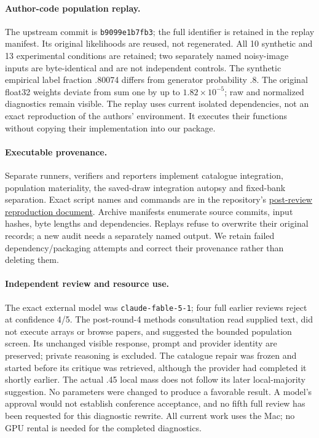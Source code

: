 \paragraph{Author-code population replay.}
The upstream commit is \texttt{b9099e1b7fb3}; the full identifier is retained
in the replay manifest.
Its original likelihoods are reused, not regenerated. All 10 synthetic and
13 experimental conditions are retained; two separately named noisy-image
inputs are byte-identical and are not independent controls. The synthetic
empirical label fraction .80074 differs from generator probability .8.
The original float32 weights deviate from sum one by up to
$1.82\times10^{-5}$; raw and normalized diagnostics remain visible.
The replay uses current isolated dependencies, not an exact reproduction
of the authors' environment. It executes their functions without copying
their implementation into our package.

\paragraph{Executable provenance.}
Separate runners, verifiers and reporters implement catalogue integration,
population materiality, the saved-draw integration autopsy and fixed-bank
separation. Exact script names and commands are in the repository's
\href{https://github.com/yashpatel5400/fourier-cryo-splats/blob/uncertainty-study/research/uncertainty/REPRODUCE-POST-REVIEW4-GATES.md}{post-review reproduction document}.
Archive manifests enumerate source commits, input hashes, byte lengths and
dependencies. Replays refuse to overwrite their original records; a new
audit needs a separately named output. We retain failed dependency/packaging
attempts and correct their provenance rather than deleting them.

\paragraph{Independent review and resource use.}
The exact external model was \texttt{claude-fable-5-1}; four full earlier
reviews reject at confidence 4/5. The post-round-4 methods consultation
read supplied text, did not execute arrays or browse papers, and suggested
the bounded population screen. Its unchanged visible response, prompt and
provider identity are preserved; private reasoning is excluded. The
catalogue repair was frozen and started before its critique was retrieved,
although the provider had completed it shortly earlier. The actual .45 local
mass does not follow its later local-majority suggestion. No parameters were
changed to produce a favorable result. A model's approval would not establish
conference acceptance, and no fifth full review has been requested for this
diagnostic rewrite. All current work uses the Mac; no GPU rental is needed
for the completed diagnostics.
